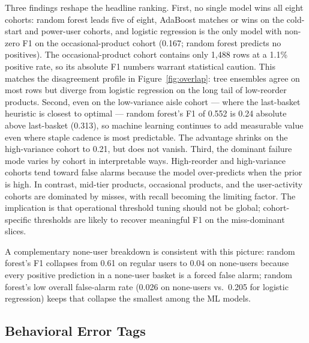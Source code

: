 \documentclass[10pt,twocolumn]{article}
\begin{document}
Three findings reshape the headline ranking. First, no single model wins all eight cohorts: random forest leads five of eight, AdaBoost matches or wins on the cold-start and power-user cohorts, and logistic regression is the only model with non-zero F1 on the occasional-product cohort (0.167; random forest predicts no positives). The occasional-product cohort contains only 1{,}488 rows at a 1.1\% positive rate, so its absolute F1 numbers warrant statistical caution. This matches the disagreement profile in Figure~\ref{fig:overlap}: tree ensembles agree on most rows but diverge from logistic regression on the long tail of low-reorder products. Second, even on the low-variance aisle cohort --- where the last-basket heuristic is closest to optimal --- random forest's F1 of 0.552 is 0.24 absolute above last-basket (0.313), so machine learning continues to add measurable value even where staple cadence is most predictable. The advantage shrinks on the high-variance cohort to 0.21, but does not vanish. Third, the dominant failure mode varies by cohort in interpretable ways. High-reorder and high-variance cohorts tend toward false alarms because the model over-predicts when the prior is high. In contrast, mid-tier products, occasional products, and the user-activity cohorts are dominated by misses, with recall becoming the limiting factor. The implication is that operational threshold tuning should not be global; cohort-specific thresholds are likely to recover meaningful F1 on the miss-dominant slices.

A complementary none-user breakdown is consistent with this picture: random forest's F1 collapses from 0.61 on regular users to 0.04 on none-users because every positive prediction in a none-user basket is a forced false alarm; random forest's low overall false-alarm rate (0.026 on none-users vs.\ 0.205 for logistic regression) keeps that collapse the smallest among the ML models.

\subsection{Behavioral Error Tags}
\end{document}
